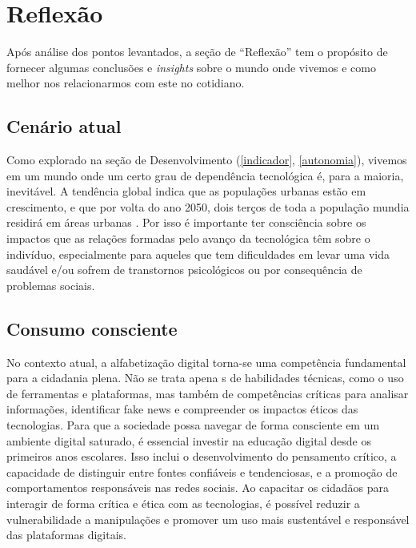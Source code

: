 \section{Reflexão}

Após análise dos pontos levantados, a seção de ``Reflexão'' tem o propósito de fornecer algumas conclusões e
\textit{insights} sobre o mundo onde vivemos e como melhor nos relacionarmos com este no cotidiano.

\subsection{Cenário atual}

Como explorado na seção de Desenvolvimento (\ref{indicador}, \ref{autonomia}), vivemos em um mundo onde um certo grau de
dependência tecnológica é, para a maioria, inevitável. A tendência global indica que as populações urbanas estão em
crescimento, e que por volta do ano 2050, dois terços de toda a população mundia residirá em áreas urbanas
\cite{nations2014world}. Por isso é importante ter consciência sobre os impactos que as relações formadas pelo avanço da
tecnológica têm sobre o indivíduo, especialmente para aqueles que tem dificuldades em levar uma vida saudável e/ou
sofrem de transtornos psicológicos ou por consequência de problemas sociais.

\subsection{Consumo consciente}

No contexto atual, a alfabetização digital torna-se uma competência fundamental para a cidadania plena. Não se trata apena
s de habilidades técnicas, como o uso de ferramentas e plataformas, mas também de competências críticas para analisar informações,
identificar fake news e compreender os impactos éticos das tecnologias. Para que a sociedade possa navegar de forma consciente
em um ambiente digital saturado, é essencial investir na educação digital desde os primeiros anos escolares. Isso inclui
o desenvolvimento do pensamento crítico, a capacidade de distinguir entre fontes confiáveis e tendenciosas, e a promoção
de comportamentos responsáveis nas redes sociais. Ao capacitar os cidadãos para interagir de forma crítica e ética com
as tecnologias, é possível reduzir a vulnerabilidade a manipulações e promover um uso mais sustentável e responsável das
plataformas digitais.


